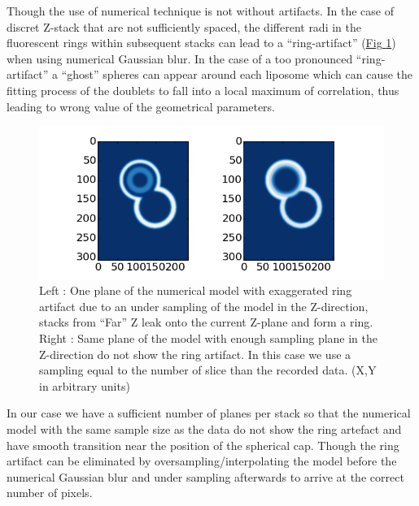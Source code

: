 \documentclass[A4paperpaper,11pt,english]{sphinxmanual}
\begin{document}
Though the use of numerical technique is not without artifacts.  In the case of
discret Z-stack that are not sufficiently spaced, the different radi in the
fluorescent rings within subsequent stacks can lead to a ``ring-artifact'' (\hyperref[parts/part4:ring-artifact]{Fig  \ref*{parts/part4:ring-artifact}}) when using numerical Gaussian blur. In the case of a too
pronounced ``ring-artifact'' a ``ghost'' spheres can appear around each liposome
which can cause the fitting process of the doublets to fall into a local
maximum of correlation, thus leading to wrong value of the geometrical
parameters.
\begin{figure}[htbp]
\centering
\capstart

\includegraphics[width=0.700\linewidth]{ring_artifact.png}
\caption{Left : One plane of the numerical model with exaggerated ring artifact due
to an under sampling of the model in the Z-direction, stacks from ``Far'' Z
leak onto the current Z-plane and form a ring.  Right : Same plane of the
model with enough sampling plane in the Z-direction do not show the ring
artifact. In this case we use a sampling equal to the number of slice than
the recorded data. (X,Y in arbitrary units)}\label{parts/part4:ring-artifact}\end{figure}

In our case we have a sufficient number of planes per stack so that the numerical model
with the same sample size as the data do not show the ring artefact and have
smooth transition near the position of the spherical cap. Though the ring
artifact can be eliminated by oversampling/interpolating the model before the
numerical Gaussian blur and under sampling afterwards to arrive at the correct number of
pixels.
\end{document}
